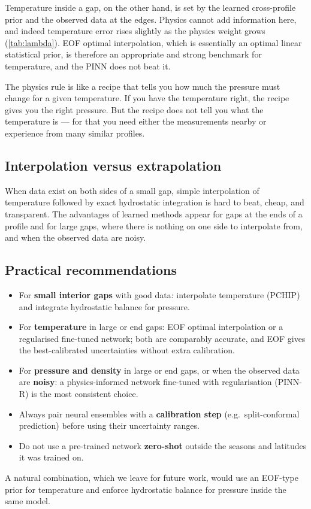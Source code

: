 \documentclass[11pt,a4paper]{article}
\newcommand{\ours}{PINN-R}
\begin{document}
Temperature inside a gap, on the other hand, is set by the learned cross-profile prior and the observed data at the edges. Physics cannot add information here, and indeed temperature error rises slightly as the physics weight grows (\cref{tab:lambda}). EOF optimal interpolation, which is essentially an optimal linear statistical prior, is therefore an appropriate and strong benchmark for temperature, and the PINN does not beat it.

\begin{plainbox}
The physics rule is like a recipe that tells you how much the pressure must change for a given temperature. If you have the temperature right, the recipe gives you the right pressure. But the recipe does not tell you what the temperature is --- for that you need either the measurements nearby or experience from many similar profiles.
\end{plainbox}

\subsection{Interpolation versus extrapolation}
When data exist on both sides of a small gap, simple interpolation of temperature followed by exact hydrostatic integration is hard to beat, cheap, and transparent. The advantages of learned methods appear for gaps at the ends of a profile and for large gaps, where there is nothing on one side to interpolate from, and when the observed data are noisy.

\subsection{Practical recommendations}
\begin{itemize}[leftmargin=*]
\item For \textbf{small interior gaps} with good data: interpolate temperature (PCHIP) and integrate hydrostatic balance for pressure.
\item For \textbf{temperature} in large or end gaps: EOF optimal interpolation or a regularised fine-tuned network; both are comparably accurate, and EOF gives the best-calibrated uncertainties without extra calibration.
\item For \textbf{pressure and density} in large or end gaps, or when the observed data are \textbf{noisy}: a physics-informed network fine-tuned with regularisation (\ours) is the most consistent choice.
\item Always pair neural ensembles with a \textbf{calibration step} (e.g.\ split-conformal prediction) before using their uncertainty ranges.
\item Do not use a pre-trained network \textbf{zero-shot} outside the seasons and latitudes it was trained on.
\end{itemize}
A natural combination, which we leave for future work, would use an EOF-type prior for temperature and enforce hydrostatic balance for pressure inside the same model.
\end{document}
